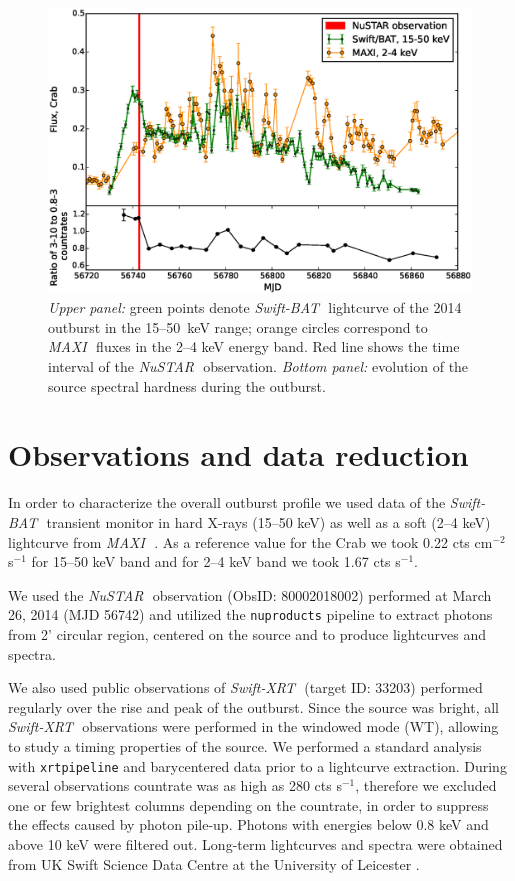 \documentclass[a4paper,fleqn,usenatbib]{mnras}
\def\swiftx{{\em Swift-XRT\,}}
\def\swiftb{{\em Swift-BAT\,}}
\def\nustar{{\em NuSTAR\,}}
\def\maxi{{\em MAXI\,}}
\begin{document}
\begin{figure}
\centerline{\includegraphics[scale=0.5]{batlc_v06.eps}}
\caption{{\it Upper panel:} green points denote \swiftb\, lightcurve of the 2014 outburst in the 15--50~keV range; orange circles correspond to \maxi\, fluxes in the 2--4 keV energy band.  
Red line shows the time interval of the \nustar\, observation. 
{\it Bottom panel:} evolution of the source spectral hardness during the outburst.} 
\label{fig:batlc}
\end{figure} 

\section{Observations and data reduction}
\label{sec:datared} 
In order to characterize the overall outburst profile we used data of the \swiftb\, transient monitor \citep{krimm13bat} in hard X-rays (15--50 keV) as well as a soft (2--4 keV) lightcurve from \maxi\, \citep{matsuoka13maxi}.  As a reference value for the Crab we took 0.22 cts cm$^{-2}$ s$^{-1}$ for 15--50 keV band and for 2--4 keV band we took 1.67 cts s$^{-1}$.

We used the \nustar\, observation (ObsID: 80002018002) performed at March 26, 2014 (MJD 56742) and utilized the \texttt{nuproducts} pipeline to extract photons from 2' circular region, centered on the source and to produce lightcurves and spectra.

We also used public observations of \swiftx\, (target ID: 33203) performed regularly over the rise and peak of the outburst.  
Since the source was bright, all \swiftx\, observations were performed in the windowed mode (WT), allowing to study a timing properties of the source. 
We performed a standard analysis with \texttt{xrtpipeline} and barycentered data prior to a lightcurve extraction. 
During several observations countrate was as high as 280 cts s$^{-1}$, therefore we excluded one or few brightest columns depending on the countrate, in order to suppress the effects caused by photon pile-up. 
Photons with energies below 0.8 keV and above 10 keV were filtered out. 
Long-term lightcurves and spectra were obtained from UK Swift Science Data Centre at the University of Leicester \citep{evans09}.
\end{document}

